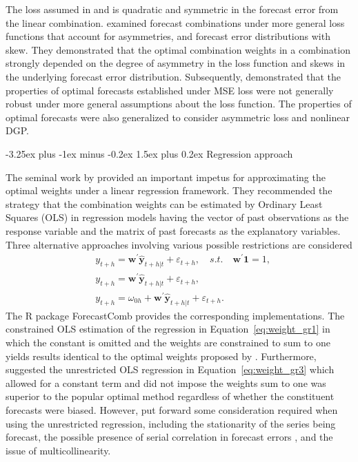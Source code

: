 \documentclass[11pt]{article}
\makeatletter
\newcommand{\pkg}[1]{{\normalfont\fontseries{b}\selectfont #1}}
\let\proglang=\textsf
\renewcommand{\paragraph}{\@startsection{paragraph}{4}{0ex}%
   {-3.25ex plus -1ex minus -0.2ex}%
   {1.5ex plus 0.2ex}%
   {\normalfont\normalsize\bfseries}}
\makeatother
\begin{document}
The loss assumed in \cite{Bates1969-yj} and \cite{Newbold1974-lp} is quadratic and symmetric in the forecast error from the linear combination. \cite{Elliott2004-dz} examined forecast combinations under more general loss functions that account for asymmetries, and forecast error distributions with skew. They demonstrated that the optimal combination weights in a combination strongly depended on the degree of asymmetry in the loss function and skews in the underlying forecast error distribution. Subsequently, \cite{Patton2007-zo} demonstrated that the properties of optimal forecasts established under MSE loss were not generally robust under more general assumptions about the loss function. The properties of optimal forecasts were also generalized to consider asymmetric loss and nonlinear DGP.

\paragraph{Regression approach}

The seminal work by \cite{Granger1984-jc} provided an important impetus for approximating the optimal weights under a linear regression framework. They recommended the strategy that the combination weights can be estimated by Ordinary Least Squares (OLS) in regression models having the vector of past observations as the response variable and the matrix of past forecasts as the explanatory variables. Three alternative approaches involving various possible restrictions are considered
\begin{align}
&y_{t+h}=\boldsymbol{w}^{\prime} \hat{\mathbf{y}}_{t+h|t}+\varepsilon_{t+h}, \quad s.t. \quad \boldsymbol{w}^{\prime}\mathbf{1}=1, \label{eq:weight_gr1}\\
&y_{t+h}=\boldsymbol{w}^{\prime} \hat{\mathbf{y}}_{t+h|t}+\varepsilon_{t+h}, \nonumber\\
&y_{t+h}=\omega_{0h}+\boldsymbol{w}^{\prime} \hat{\mathbf{y}}_{t+h|t}+\varepsilon_{t+h}. \label{eq:weight_gr3}
\end{align}
The \proglang{R} package \pkg{ForecastComb} provides the corresponding implementations. The constrained OLS estimation of the regression in Equation~\eqref{eq:weight_gr1} in which the constant is omitted and the weights are constrained to sum to one yields results identical to the optimal weights proposed by \cite{Bates1969-yj}. Furthermore, \cite{Granger1984-jc} suggested the unrestricted OLS regression in Equation~\eqref{eq:weight_gr3} which allowed for a constant term and did not impose the weights sum to one was superior to the popular optimal method regardless of whether the constituent forecasts were biased. However, \cite{De_Menezes2000-vd} put forward some consideration required when using the unrestricted regression, including the stationarity of the series being forecast, the possible presence of serial correlation in forecast errors \citep[see also][]{Diebold1988-sx,Edward_Coulson1993-db}, and the issue of multicollinearity.
\end{document}
